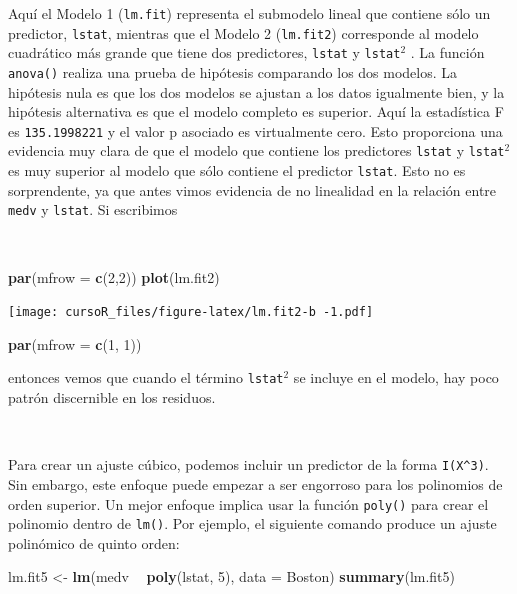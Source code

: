 \documentclass[]{book}
\newenvironment{Shaded}{\begin{snugshade}}{\end{snugshade}}
\newcommand{\KeywordTok}[1]{\textcolor[rgb]{0.13,0.29,0.53}{\textbf{#1}}}
\newcommand{\DataTypeTok}[1]{\textcolor[rgb]{0.13,0.29,0.53}{#1}}
\newcommand{\DecValTok}[1]{\textcolor[rgb]{0.00,0.00,0.81}{#1}}
\newcommand{\StringTok}[1]{\textcolor[rgb]{0.31,0.60,0.02}{#1}}
\newcommand{\OperatorTok}[1]{\textcolor[rgb]{0.81,0.36,0.00}{\textbf{#1}}}
\newcommand{\NormalTok}[1]{#1}
\begin{document}
Aquí el Modelo 1 (\texttt{lm.fit}) representa el submodelo lineal que
contiene sólo un predictor, \texttt{lstat}, mientras que el Modelo 2
(\texttt{lm.fit2}) corresponde al modelo cuadrático más grande que tiene
dos predictores, \texttt{lstat} y \texttt{lstat}\(^2\) . La función
\texttt{anova()} realiza una prueba de hipótesis comparando los dos
modelos. La hipótesis nula es que los dos modelos se ajustan a los datos
igualmente bien, y la hipótesis alternativa es que el modelo completo es
superior. Aquí la estadística F es \texttt{135.1998221} y el valor p
asociado es virtualmente cero. Esto proporciona una evidencia muy clara
de que el modelo que contiene los predictores \texttt{lstat} y
\texttt{lstat}\(^2\) es muy superior al modelo que sólo contiene el
predictor \texttt{lstat}. Esto no es sorprendente, ya que antes vimos
evidencia de no linealidad en la relación entre \texttt{medv} y
\texttt{lstat}. Si escribimos

~

\begin{Shaded}
\begin{Highlighting}[]
\KeywordTok{par}\NormalTok{(}\DataTypeTok{mfrow =} \KeywordTok{c}\NormalTok{(}\DecValTok{2}\NormalTok{,}\DecValTok{2}\NormalTok{))}
\KeywordTok{plot}\NormalTok{(lm.fit2)}
\end{Highlighting}
\end{Shaded}

\texttt{[image: cursoR\_files/figure-latex/lm.fit2-b -1.pdf]}

\begin{Shaded}
\begin{Highlighting}[]
\KeywordTok{par}\NormalTok{(}\DataTypeTok{mfrow =} \KeywordTok{c}\NormalTok{(}\DecValTok{1}\NormalTok{, }\DecValTok{1}\NormalTok{))}
\end{Highlighting}
\end{Shaded}

entonces vemos que cuando el término \texttt{lstat}\(^2\) se incluye en
el modelo, hay poco patrón discernible en los residuos.

~

Para crear un ajuste cúbico, podemos incluir un predictor de la forma
\texttt{I(X\^{}3)}. Sin embargo, este enfoque puede empezar a ser
engorroso para los polinomios de orden superior. Un mejor enfoque
implica usar la función \texttt{poly()} para crear el polinomio dentro
de \texttt{lm()}. Por ejemplo, el siguiente comando produce un ajuste
polinómico de quinto orden:

\begin{Shaded}
\begin{Highlighting}[]
\NormalTok{lm.fit5 <-}\StringTok{ }\KeywordTok{lm}\NormalTok{(medv }\OperatorTok{~}\StringTok{ }\KeywordTok{poly}\NormalTok{(lstat, }\DecValTok{5}\NormalTok{), }\DataTypeTok{data =}\NormalTok{ Boston)}
\KeywordTok{summary}\NormalTok{(lm.fit5)}
\end{Highlighting}
\end{Shaded}
\end{document}

